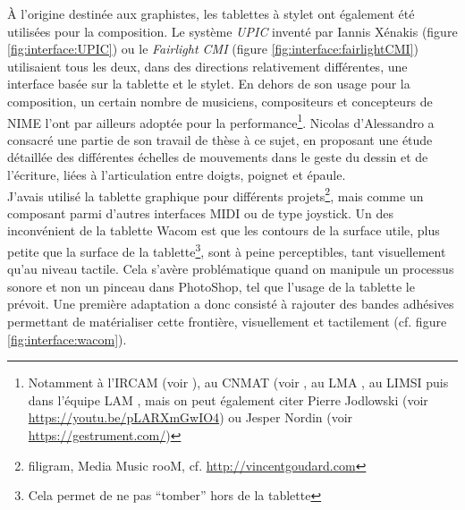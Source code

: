 \indent À l'origine destinée aux graphistes, les tablettes à stylet ont également été utilisées pour la composition. Le système \textit{UPIC} inventé par Iannis Xénakis (figure \ref{fig:interface:UPIC}) ou le \textit{Fairlight CMI}  (figure \ref{fig:interface:fairlightCMI}) utilisaient tous les deux, dans des directions relativement différentes, une interface basée sur la tablette et le stylet. En dehors de son usage pour la composition, un certain nombre de musiciens, compositeurs et concepteurs de \gls{NIME} l’ont par ailleurs adoptée pour la performance\footnote{Notamment à l'\gls{IRCAM} (voir \cite{wanderley_choice_2000}), au \gls{CNMAT} (voir \cite{zbyszynski_ten_2007}, au \gls{LMA} \cite{couturier_utilisation_2004}, au \gls{LIMSI} \cite{feugere_chorus_2011} puis dans l'équipe \gls{LAM} \cite{xiao_t-voks_2019}, mais on peut également citer Pierre Jodlowski (voir \url{https://youtu.be/pLARXmGwIO4}) ou Jesper Nordin (voir \url{https://gestrument.com/})}. Nicolas d’Alessandro a consacré une partie de son travail de thèse \cite{dalessandro_realtime_2009} à ce sujet, en proposant une étude détaillée des différentes échelles de mouvements dans le geste du dessin et de l'écriture, liées à l'articulation entre doigts, poignet et épaule.\\
\indent J'avais utilisé la tablette graphique pour différents projets\footnote{filigram, Media Music rooM, cf. \url{http://vincentgoudard.com}}, mais comme un composant parmi d'autres interfaces \gls{MIDI} ou de type joystick.
\indent Un des inconvénient de la tablette Wacom est que les contours de la surface utile, plus petite que la surface de la tablette\footnote{Cela permet de ne pas ``tomber'' hors de la tablette}, sont à peine perceptibles, tant visuellement qu'au niveau tactile. Cela s'avère problématique quand on manipule un processus sonore et non un pinceau dans PhotoShop, tel que l'usage de la tablette le prévoit. Une première adaptation a donc consisté à rajouter des bandes adhésives permettant de matérialiser cette frontière, visuellement et tactilement (cf. figure \ref{fig:interface:wacom}).\\
